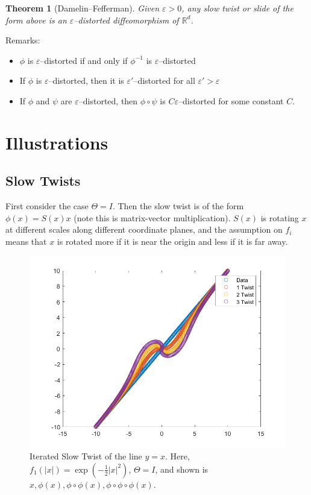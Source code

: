\documentclass{amsart}
\newtheorem{theorem}{Theorem}
\theoremstyle{remark}
\theoremstyle{definition}
\newcommand{\R}{\mathbb{R}}
\newcommand{\eps}{\varepsilon}
\begin{document}
\begin{theorem}[Damelin--Fefferman]
Given $\eps>0$, any slow twist or slide of the form above is an $\eps$--distorted diffeomorphism of $\R^d$.
\end{theorem}

Remarks:
\begin{itemize}
\item $\phi$ is $\eps$--distorted if and only if $\phi^{-1}$ is $\eps$--distorted
\item If $\phi$ is $\eps$--distorted, then it is $\eps'$--distorted for all $\eps'>\eps$
\item If $\phi$ and $\psi$ are $\eps$--distorted, then $\phi\circ\psi$ is $C\eps$--distorted for some constant $C$.
\end{itemize}


\section{Illustrations}

\subsection{Slow Twists}

First consider the case $\Theta = I$.  Then the slow twist is of the form $\phi(x) = S(x)x$ (note this is matrix-vector multiplication).  $S(x)$ is rotating $x$ at different scales along different coordinate planes, and the assumption on $f_i$ means that $x$ is rotated more if it is near the origin and less if it is far away.  

\begin{figure}[h!]\label{FIG:Twist}
\centering \includegraphics[scale=0.35]{SlowTwist.png}

\caption{Iterated Slow Twist of the line $y=x$.  Here, $f_1(|x|) = \exp(-\frac12 |x|^2)$, $\Theta=I$, and shown is $x, \phi(x), \phi\circ\phi(x), \phi\circ\phi\circ\phi(x)$.}
\end{figure}
\end{document}
